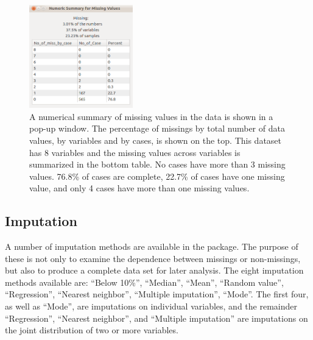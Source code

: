 \documentclass[article]{jss}
\begin{document}
\begin{center}
%
\begin{figure}[h]
\begin{centering}
\includegraphics[width=0.4\textwidth]{Miss_fig2}
\par\end{centering}
\caption{A numerical summary of missing values in the data is shown in a pop-up window.  The percentage of missings by total number of data values, by variables and by cases, is shown on the top. This dataset has 8 variables and the missing values across variables is summarized in the bottom table. No cases have more than 3 missing values.  76.8\% of cases are complete, 22.7\% of cases have one missing value, and only 4 cases have more than one missing values.}
\label{fig: num-summry}
\end{figure}

\par\end{center}

\subsection{Imputation}

A number of imputation methods are available in the package. The purpose of these is not only to examine the dependence between missings or non-missings, but also to produce a complete data set for later analysis.  The eight imputation methods available are: 
``Below 10\%'', ``Median'', ``Mean'', 
``Random value'', ``Regression'', ``Nearest neighbor'', 
``Multiple imputation'', ``Mode''. 
The first four, as well as ``Mode'', are imputations on individual variables, and the remainder  ``Regression'', ``Nearest neighbor'', and ``Multiple imputation'' are imputations on the joint distribution of two or more  variables.
\end{document}
